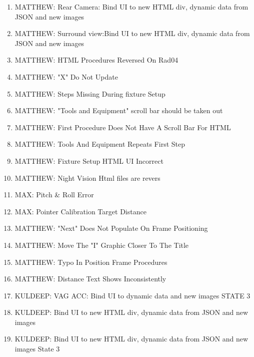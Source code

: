 \begin{enumerate}[leftmargin=!,labelindent=5pt,itemindent=-35pt]
\item {} MATTHEW: Rear Camera: Bind UI to new HTML div, dynamic data from JSON and new images
\item {} MATTHEW: Surround view:Bind UI to new HTML div, dynamic data from JSON and new images
\item {} MATTHEW: HTML Procedures Reversed On Rad04
\item {} MATTHEW: "X" Do Not Update
\item {} MATTHEW: Steps Missing During fixture Setup
\item {} MATTHEW: "Tools and Equipment" scroll bar should be taken out
\item {} MATTHEW: First Procedure Does Not Have A Scroll Bar For HTML
\item {} MATTHEW: Tools And Equipment Repeats First Step
\item {} MATTHEW: Fixture Setup HTML UI Incorrect
\item {} MATTHEW: Night Vision Html files are revers
\item {} MAX: Pitch \& Roll Error
\item {} MAX: Pointer Calibration Target Distance
\item {} MATTHEW: "Next" Does Not Populate On Frame Positioning
\item {} MATTHEW: Move The "I" Graphic Closer To The Title
\item {} MATTHEW: Typo In Position Frame Procedures
\item {} MATTHEW: Distance Text Shows Inconsistently
\item {} KULDEEP: VAG ACC: Bind UI to dynamic data and new images STATE 3
\item {} KULDEEP: Bind UI to new HTML div, dynamic data from JSON and new images
\item {} KULDEEP: Bind UI to new HTML div, dynamic data from JSON and new images State 3
\end{enumerate}\vspace{.5cm}

